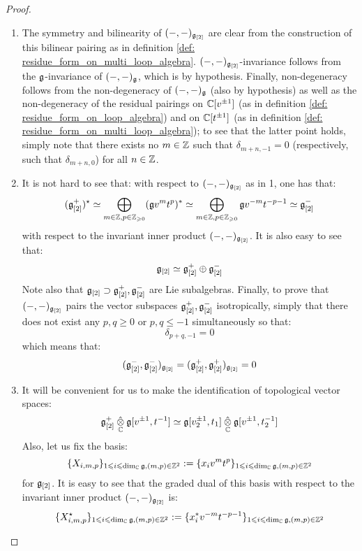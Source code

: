                 \begin{proof}
                    \begin{enumerate}
                        \item The symmetry and bilinearity of $(-, -)_{\mathfrak{g}_{[2]}}$ are clear from the construction of this bilinear pairing as in definition \ref{def: residue_form_on_multi_loop_algebra}. $(-, -)_{\mathfrak{g}_{[2]}}$-invariance follows from the $\mathfrak{g}$-invariance of $(-, -)_{\mathfrak{g}}$, which is by hypothesis. Finally, non-degeneracy follows from the non-degeneracy of $(-, -)_{\mathfrak{g}}$ (also by hypothesis) as well as the non-degeneracy of the residual pairings on $\mathbb{C}[v^{\pm 1}]$ (as in definition \ref{def: residue_form_on_loop_algebra}) and on $\mathbb{C}[t^{\pm 1}]$ (as in definition \ref{def: residue_form_on_multi_loop_algebra}); to see that the latter point holds, simply note that there exists no $m \in \mathbb{Z}$ such that $\delta_{m + n, - 1} = 0$ (respectively, such that $\delta_{m + n, 0}$) for all $n \in \mathbb{Z}$.
                        \item It is not hard to see that: with respect to $(-, -)_{\mathfrak{g}_{[2]}}$ as in 1, one has that:
                            $$(\mathfrak{g}_{[2]}^+)^{\star} \simeq \bigoplus_{m \in \mathbb{Z}, p \in \mathbb{Z}_{\geqslant 0}} (\mathfrak{g} v^m t^p)^* \simeq \bigoplus_{m \in \mathbb{Z}, p \in \mathbb{Z}_{\geqslant 0}} \mathfrak{g} v^{-m} t^{-p - 1} \simeq \mathfrak{g}_{[2]}^-$$
                        with respect to the invariant inner product $(-, -)_{\mathfrak{g}_{[2]}}$. It is also easy to see that:
                            $$\mathfrak{g}_{[2]} \simeq \mathfrak{g}_{[2]}^+ \oplus \mathfrak{g}_{[2]}^-$$
                        Note also that $\mathfrak{g}_{[2]} \supset \mathfrak{g}_{[2]}^+, \mathfrak{g}_{[2]}^-$ are Lie subalgebras. Finally, to prove that $(-, -)_{\mathfrak{g}_{[2]}}$ pairs the vector subspaces $\mathfrak{g}_{[2]}^+, \mathfrak{g}_{[2]}^-$ isotropically, simply that there does not exist any $p, q \geq 0$ or $p, q \leq -1$ simultaneously so that:
                            $$\delta_{p + q, -1} = 0$$
                        which means that:
                            $$(\mathfrak{g}_{[2]}^-, \mathfrak{g}_{[2]}^-)_{\mathfrak{g}_{[2]}} = (\mathfrak{g}_{[2]}^+, \mathfrak{g}_{[2]}^+)_{\mathfrak{g}_{[2]}} = 0$$
                        \item It will be convenient for us to make the identification of topological vector spaces:
                            $$\g_{[2]}^+ \hattensor_{\bbC} \g[v^{\pm 1}, t^{-1}] \cong \g[v_2^{\pm 1}, t_1] \hattensor_{\bbC} \g[v^{\pm 1}, t_2^{-1}]$$
                        Also, let us fix the basis:
                            $$\{X_{i, m, p}\}_{1 \leqslant i \leqslant \dim_{\mathbb{C}} \mathfrak{g}, (m, p) \in \mathbb{Z}^2} := \{x_i v^m t^p\}_{1 \leqslant i \leqslant \dim_{\mathbb{C}} \mathfrak{g}, (m, p) \in \mathbb{Z}^2}$$
                        for $\mathfrak{g}_{[2]}$. It is easy to see that the graded dual of this basis with respect to the invariant inner product $(-, -)_{\mathfrak{g}_{[2]}}$ is:
                            $$\{X_{i, m, p}^{\star}\}_{1 \leqslant i \leqslant \dim_{\mathbb{C}} \mathfrak{g}, (m, p) \in \mathbb{Z}^2} := \{x_i^* v^{-m} t^{-p - 1}\}_{1 \leqslant i \leqslant \dim_{\mathbb{C}} \mathfrak{g}, (m, p) \in \mathbb{Z}^2}$$
                        

\end{enumerate}
\end{proof}
